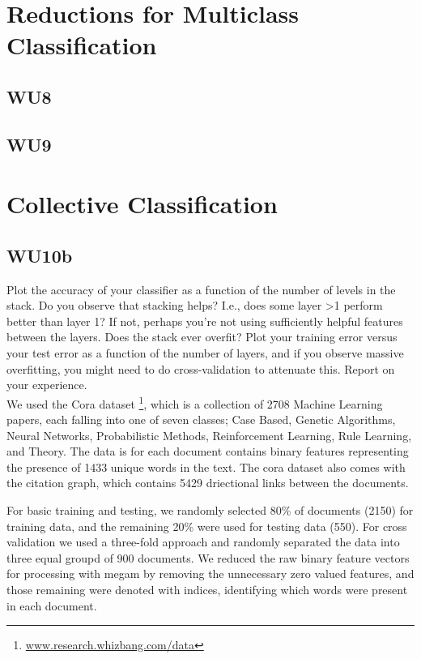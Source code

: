 \documentclass[a4paper,11pt]{article}
\begin{document}
\pagebreak
\section{Reductions for Multiclass Classification}
\subsection{WU8}
\textsf{}

\subsection{WU9}
\textsf{}

\pagebreak
\section{Collective Classification}
\subsection{WU10b}
\textsf{Plot the accuracy of your classifier as a function
  of the number of levels in the stack. Do you observe that stacking
  helps? I.e., does some layer >1 perform better than layer 1? If not,
  perhaps you're not using sufficiently helpful features between the
  layers. Does the stack ever overfit? Plot your training error versus
  your test error as a function of the number of layers, and if you
  observe massive overfitting, you might need to do cross-validation
  to attenuate this. Report on your experience.}\\

We used the Cora dataset \footnote{\url{www.research.whizbang.com/data}}, which is a collection of
2708 Machine Learning papers, each falling into one of seven
classes; Case Based, Genetic Algorithms, Neural Networks,
Probabilistic Methods, Reinforcement Learning, Rule Learning,
and Theory. The data is for each document contains binary features representing
the presence of 1433 unique words in the text. The cora dataset 
also comes with the citation graph, 
which contains 5429 driectional links between the documents.

For basic training and testing, we randomly selected 80\% of documents (2150) 
for training data, and the remaining 20\% were used for testing data (550).
For cross validation we used a three-fold approach and randomly separated 
the data into three equal groupd of 900 documents. 
We reduced the raw binary feature vectors for processing with megam
by removing the unnecessary zero valued features, and those remaining 
were denoted with indices, identifying which words were present in each document.
\end{document}
